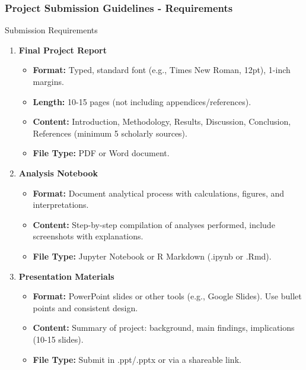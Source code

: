 \documentclass[aspectratio=169]{beamer}
\begin{document}
\begin{frame}[fragile]
    \frametitle{Project Submission Guidelines - Requirements}
    \begin{block}{Submission Requirements}
        \begin{enumerate}
            \item \textbf{Final Project Report}
                \begin{itemize}
                    \item \textbf{Format:} Typed, standard font (e.g., Times New Roman, 12pt), 1-inch margins.
                    \item \textbf{Length:} 10-15 pages (not including appendices/references).
                    \item \textbf{Content:} Introduction, Methodology, Results, Discussion, Conclusion, References (minimum 5 scholarly sources).
                    \item \textbf{File Type:} PDF or Word document.
                \end{itemize}
            
            \item \textbf{Analysis Notebook}
                \begin{itemize}
                    \item \textbf{Format:} Document analytical process with calculations, figures, and interpretations.
                    \item \textbf{Content:} Step-by-step compilation of analyses performed, include screenshots with explanations.
                    \item \textbf{File Type:} Jupyter Notebook or R Markdown (.ipynb or .Rmd).
                \end{itemize}
            
            \item \textbf{Presentation Materials}
                \begin{itemize}
                    \item \textbf{Format:} PowerPoint slides or other tools (e.g., Google Slides). Use bullet points and consistent design.
                    \item \textbf{Content:} Summary of project: background, main findings, implications (10-15 slides).
                    \item \textbf{File Type:} Submit in .ppt/.pptx or via a shareable link.
                \end{itemize}
        \end{enumerate}
    \end{block}
\end{frame}
\end{document}
